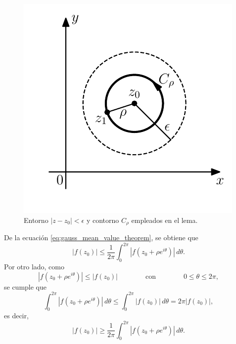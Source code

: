 \documentclass[a4paper]{report}
\begin{document}
\begin{figure}[!htb]
  \begin{minipage}[c]{0.32\textwidth}
    \includegraphics[width=\textwidth]{figuras/maximum_modulus_principle_lemma.pdf}
  \end{minipage}\hfill
  \begin{minipage}[c]{0.58\textwidth}
    \caption{
       Entorno \(|z-z_0|<\epsilon\) y contorno \(C_\rho\) empleados en el lema.
    }\label{fig:maximum_modulus_principle_lemma}
  \end{minipage}
\end{figure}
De la ecuación \ref{eq:gauss_mean_value_theorem}, se obtiene que 
\begin{equation}\label{eq:maximum_modulus_principle_lemma_tmp_01}
 |f(z_0)|\leq\frac{1}{2\pi}\int_0^{2\pi}|f(z_0+\rho e^{i\theta})|\,d\theta. 
\end{equation}
Por otro lado, como 
\begin{equation}\label{eq:maximum_modulus_principle_lemma_tmp_03}
 |f(z_0+\rho e^{i\theta})|\leq|f(z_0)|
 \qquad\qquad\textrm{con}\qquad\qquad
 0\leq\theta\leq2\pi, 
\end{equation}
se cumple que 
\[
 \int_0^{2\pi}|f(z_0+\rho e^{i\theta})|\,d\theta\leq\int_0^{2\pi}|f(z_0)|\,d\theta=2\pi|f(z_0)|,
\]
es decir,
\begin{equation}\label{eq:maximum_modulus_principle_lemma_tmp_02}
 |f(z_0)|\geq\frac{1}{2\pi}\int_0^{2\pi}|f(z_0+\rho e^{i\theta})|\,d\theta. 
\end{equation}
\end{document}
